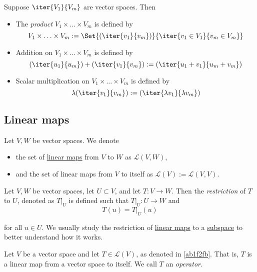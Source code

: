 \label{ff8936a}

Suppose $\iter{V_1}{V_m}$ are vector spaces. Then
\begin{itemize}
  \item The \textit{product} $V_1\times\ldots\times V_m$ is defined by
        $$
          V_1\times\ldots\times V_m:=\Set{(\iter{v_1}{v_m})}{\iter{v_1\in V_1}{v_m\in V_m}}
        $$
  \item Addition on $V_1\times\ldots\times V_m$ is defined by
        $$
          (\iter{u_1}{u_m})+(\iter{v_1}{v_m}):=(\iter{u_1+v_1}{u_m+v_m})
        $$
  \item Scalar multiplication on $V_1\times\ldots\times V_m$ is defined by
        $$
          \lambda(\iter{v_1}{v_m}):=(\iter{\lambda v_1}{\lambda v_m})
        $$
\end{itemize}

\subsection{Linear maps}\label{e1094f4}

\label{ab1f2fb}

Let $V,W$ be vector spaces. We denote
\begin{itemize}
  \item the set of \href{d7d1925}{linear maps} from $V$ to $W$ as $\mathcal
        L(V,W)$,
  \item and the set of linear maps from $V$ to itself as $\mathcal
        L(V):=\mathcal L(V,V)$.
\end{itemize}

\label{efec72b}

Let $V,W$ be vector spaces, let $U\subset V$, and let $T:V\to W$. Then the
\textit{restriction} of $T$ to $U$, denoted as $T|_U$ is defined such that
$T|_U:U\to W$ and
$$
  T(u)=T|_U(u)
$$

for all $u\in U$. We usually study the restriction of \href{d7d1925}{linear
maps} to a \href{a0f0f06}{subspace} to better understand how it works.

\label{bd31d9c}

Let $V$ be a vector space and let $T\in\mathcal L(V)$, as denoted in
\autoref{ab1f2fb}. That is, $T$ is a linear map from a vector space to itself.
We call $T$ an \textit{operator}.

\label{e52bb69}


